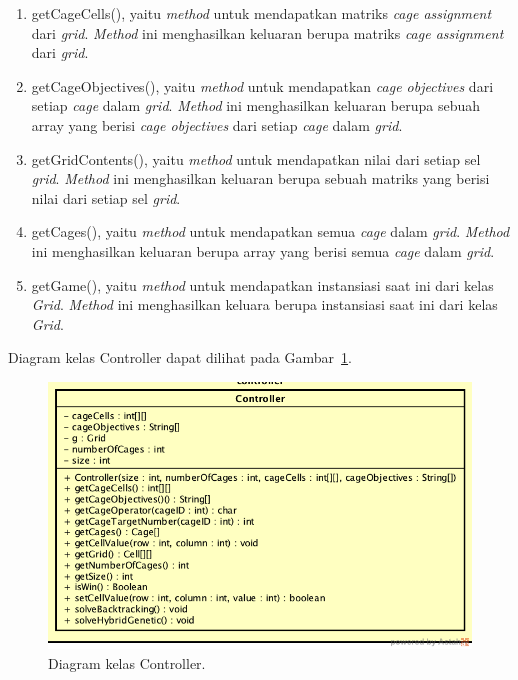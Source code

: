 \begin{enumerate}
\item getCageCells(), yaitu \textit{method} untuk mendapatkan matriks \textit{cage assignment} dari \textit{grid}. \textit{Method} ini menghasilkan keluaran berupa matriks \textit{cage assignment} dari \textit{grid}.
\item getCageObjectives(), yaitu \textit{method} untuk mendapatkan \textit{cage objectives} dari setiap \textit{cage} dalam \textit{grid}. \textit{Method} ini menghasilkan keluaran berupa sebuah array yang berisi \textit{cage objectives} dari setiap \textit{cage} dalam \textit{grid}.
\item getGridContents(), yaitu \textit{method} untuk mendapatkan nilai dari setiap sel \textit{grid}. \textit{Method} ini menghasilkan keluaran berupa sebuah matriks yang berisi nilai dari setiap sel \textit{grid}.
\item getCages(), yaitu \textit{method} untuk mendapatkan semua \textit{cage} dalam \textit{grid}. \textit{Method} ini menghasilkan keluaran berupa array yang berisi semua \textit{cage} dalam \textit{grid}.
\item getGame(), yaitu \textit{method} untuk mendapatkan instansiasi saat ini dari kelas \textit{Grid}. \textit{Method} ini menghasilkan keluara berupa instansiasi saat ini dari kelas \textit{Grid}.
\end{enumerate}

Diagram kelas Controller dapat dilihat pada Gambar~\ref{fig:diagramkelascontroller}.

\begin{figure}
\centering
\captionsetup{justification=centering}
\includegraphics[scale=0.5]{Gambar/Perancangan/DiagramKelasController.png}
\caption[Diagram kelas Controller.]{Diagram kelas Controller.}
\label{fig:diagramkelascontroller}
\end{figure}

